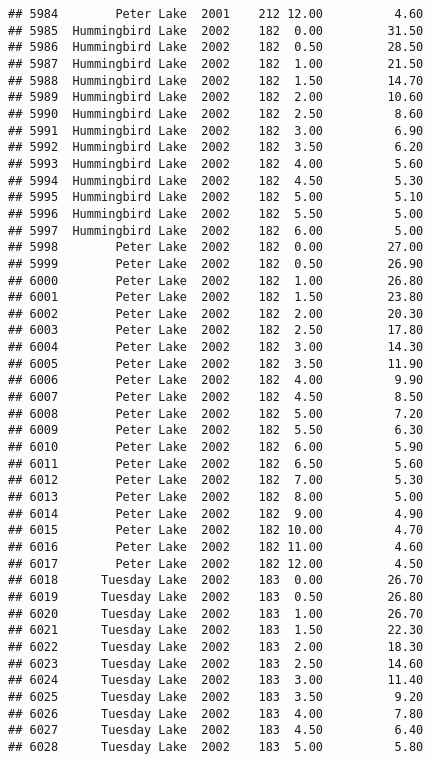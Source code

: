 \documentclass[
]{article}
\begin{document}
\begin{verbatim}
## 5984        Peter Lake  2001    212 12.00          4.60
## 5985  Hummingbird Lake  2002    182  0.00         31.50
## 5986  Hummingbird Lake  2002    182  0.50         28.50
## 5987  Hummingbird Lake  2002    182  1.00         21.50
## 5988  Hummingbird Lake  2002    182  1.50         14.70
## 5989  Hummingbird Lake  2002    182  2.00         10.60
## 5990  Hummingbird Lake  2002    182  2.50          8.60
## 5991  Hummingbird Lake  2002    182  3.00          6.90
## 5992  Hummingbird Lake  2002    182  3.50          6.20
## 5993  Hummingbird Lake  2002    182  4.00          5.60
## 5994  Hummingbird Lake  2002    182  4.50          5.30
## 5995  Hummingbird Lake  2002    182  5.00          5.10
## 5996  Hummingbird Lake  2002    182  5.50          5.00
## 5997  Hummingbird Lake  2002    182  6.00          5.00
## 5998        Peter Lake  2002    182  0.00         27.00
## 5999        Peter Lake  2002    182  0.50         26.90
## 6000        Peter Lake  2002    182  1.00         26.80
## 6001        Peter Lake  2002    182  1.50         23.80
## 6002        Peter Lake  2002    182  2.00         20.30
## 6003        Peter Lake  2002    182  2.50         17.80
## 6004        Peter Lake  2002    182  3.00         14.30
## 6005        Peter Lake  2002    182  3.50         11.90
## 6006        Peter Lake  2002    182  4.00          9.90
## 6007        Peter Lake  2002    182  4.50          8.50
## 6008        Peter Lake  2002    182  5.00          7.20
## 6009        Peter Lake  2002    182  5.50          6.30
## 6010        Peter Lake  2002    182  6.00          5.90
## 6011        Peter Lake  2002    182  6.50          5.60
## 6012        Peter Lake  2002    182  7.00          5.30
## 6013        Peter Lake  2002    182  8.00          5.00
## 6014        Peter Lake  2002    182  9.00          4.90
## 6015        Peter Lake  2002    182 10.00          4.70
## 6016        Peter Lake  2002    182 11.00          4.60
## 6017        Peter Lake  2002    182 12.00          4.50
## 6018      Tuesday Lake  2002    183  0.00         26.70
## 6019      Tuesday Lake  2002    183  0.50         26.80
## 6020      Tuesday Lake  2002    183  1.00         26.70
## 6021      Tuesday Lake  2002    183  1.50         22.30
## 6022      Tuesday Lake  2002    183  2.00         18.30
## 6023      Tuesday Lake  2002    183  2.50         14.60
## 6024      Tuesday Lake  2002    183  3.00         11.40
## 6025      Tuesday Lake  2002    183  3.50          9.20
## 6026      Tuesday Lake  2002    183  4.00          7.80
## 6027      Tuesday Lake  2002    183  4.50          6.40
## 6028      Tuesday Lake  2002    183  5.00          5.80

\end{verbatim}
\end{document}

